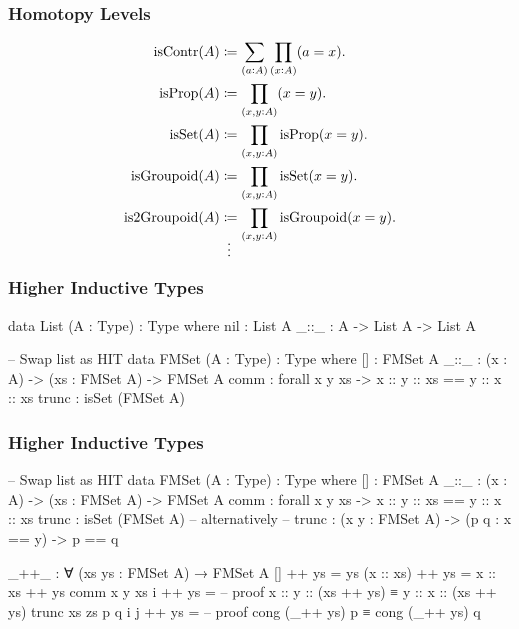 \documentclass{beamer}
\begin{document}
\begin{frame}
\frametitle{Homotopy Levels}

\begin{align*}
  \text{isContr}(A) & \coloneqq \sum_{(a:A)} \prod_{(x:A)} (a = x).
  \\
  \text{isProp}(A) & \coloneqq \prod_{(x,y:A)} (x = y).
  \\
  \text{isSet}(A) & \coloneqq \prod_{(x,y:A)} \text{isProp}(x = y).
  \\
  \text{isGroupoid}(A) & \coloneqq \prod_{(x,y:A)} \text{isSet}(x = y).
  \\
  \text{is2Groupoid}(A) & \coloneqq \prod_{(x,y:A)} \text{isGroupoid}(x = y).
  \\
  \shortvdotswithin{=}
\end{align*}

\end{frame}


\begin{frame}[fragile]
\frametitle{Higher Inductive Types}

\begin{code}
data List (A : Type) : Type where
  nil : List A
  _::_ : A -> List A -> List A

-- Swap list as HIT
data FMSet (A : Type) : Type where
  []    : FMSet A
  _::_  : (x : A) -> (xs : FMSet A) -> FMSet A
  comm  : forall x y xs -> x :: y :: xs == y :: x :: xs
  trunc : isSet (FMSet A)
\end{code}

\end{frame}

\begin{frame}[fragile]
\frametitle{Higher Inductive Types}

\begin{code}
-- Swap list as HIT
data FMSet (A : Type) : Type where
  []    : FMSet A
  _::_  : (x : A) -> (xs : FMSet A) -> FMSet A
  comm  : forall x y xs -> x :: y :: xs == y :: x :: xs
  trunc : isSet (FMSet A)
  -- alternatively
  -- trunc : (x y : FMSet A) -> (p q : x == y) -> p == q

_++_ : ∀ (xs ys : FMSet A) → FMSet A
[] ++ ys = ys
(x :: xs) ++ ys = x :: xs ++ ys
comm x y xs i ++ ys =
  -- proof x :: y :: (xs ++ ys) ≡ y :: x :: (xs ++ ys)
trunc xs zs p q i j ++ ys =
  -- proof cong (_++ ys) p ≡ cong (_++ ys) q
\end{code}

\end{frame}
\end{document}
